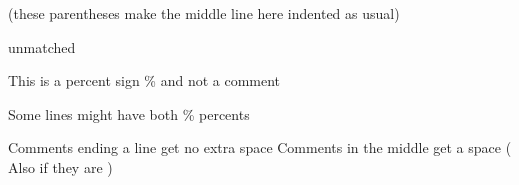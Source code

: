 \documentclass{article}
\begin{document}
(these parentheses
make the middle line here
indented as usual)


unmatched %

This is a percent sign \% and not a comment

Some lines might have both \% percents %

Comments ending a line get no extra space%
Comments in the middle get a space%
(
Also if they are
)
\end{document}
